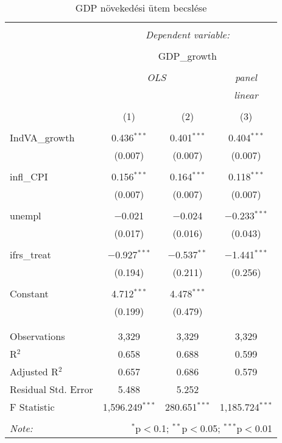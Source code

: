 
\begin{table}[!htbp] \centering 
  \caption{GDP növekedési ütem becslése} 
  \label{} 
\begin{tabular}{@{\extracolsep{5pt}}lccc} 
\\[-1.8ex]\hline 
\hline \\[-1.8ex] 
 & \multicolumn{3}{c}{\textit{Dependent variable:}} \\ 
\cline{2-4} 
\\[-1.8ex] & \multicolumn{3}{c}{GDP\_growth} \\ 
\\[-1.8ex] & \multicolumn{2}{c}{\textit{OLS}} & \textit{panel} \\ 
 & \multicolumn{2}{c}{\textit{}} & \textit{linear} \\ 
\\[-1.8ex] & (1) & (2) & (3)\\ 
\hline \\[-1.8ex] 
 IndVA\_growth & 0.436$^{***}$ & 0.401$^{***}$ & 0.404$^{***}$ \\ 
  & (0.007) & (0.007) & (0.007) \\ 
  & & & \\ 
 infl\_CPI & 0.156$^{***}$ & 0.164$^{***}$ & 0.118$^{***}$ \\ 
  & (0.007) & (0.007) & (0.007) \\ 
  & & & \\ 
 unempl & $-$0.021 & $-$0.024 & $-$0.233$^{***}$ \\ 
  & (0.017) & (0.016) & (0.043) \\ 
  & & & \\ 
 ifrs\_treat & $-$0.927$^{***}$ & $-$0.537$^{**}$ & $-$1.441$^{***}$ \\ 
  & (0.194) & (0.211) & (0.256) \\ 
  & & & \\ 
 Constant & 4.712$^{***}$ & 4.478$^{***}$ &  \\ 
  & (0.199) & (0.479) &  \\ 
  & & & \\ 
\hline \\[-1.8ex] 
Observations & 3,329 & 3,329 & 3,329 \\ 
R$^{2}$ & 0.658 & 0.688 & 0.599 \\ 
Adjusted R$^{2}$ & 0.657 & 0.686 & 0.579 \\ 
Residual Std. Error & 5.488 & 5.252 &  \\ 
F Statistic & 1,596.249$^{***}$ & 280.651$^{***}$ & 1,185.724$^{***}$ \\ 
\hline 
\hline \\[-1.8ex] 
\textit{Note:}  & \multicolumn{3}{r}{$^{*}$p$<$0.1; $^{**}$p$<$0.05; $^{***}$p$<$0.01} \\ 
\end{tabular} 
\end{table} 
